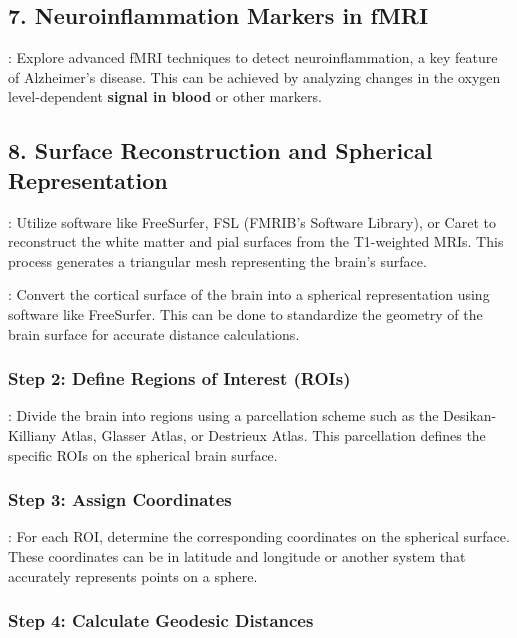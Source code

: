 \documentclass[twocolumn]{article}
\begin{document}
\subsection*{7. Neuroinflammation Markers in fMRI}

: Explore advanced fMRI techniques to detect neuroinflammation, a key feature of Alzheimer's disease. This can be
achieved by analyzing changes in the oxygen level-dependent \textbf{ signal in blood} or other markers.

\subsection*{8. Surface Reconstruction and Spherical Representation}

: Utilize software like FreeSurfer, FSL (FMRIB's Software Library), or Caret to reconstruct the white matter
and pial surfaces from the T1-weighted MRIs. This process generates a triangular mesh representing the brain's surface.

: Convert the cortical surface of the brain into a spherical representation using software like FreeSurfer. This can be
done to standardize the geometry of the brain surface for accurate distance calculations.

\subsubsection*{Step  2: Define Regions of Interest (ROIs)}

: Divide the brain into regions using a parcellation scheme such as the Desikan-Killiany Atlas, Glasser Atlas, or
Destrieux Atlas. This parcellation defines the specific ROIs on the spherical brain surface.

\subsubsection*{Step  3: Assign Coordinates}

: For each ROI, determine the corresponding coordinates on the spherical surface. These coordinates can be in
latitude and longitude or another system that accurately represents points on a sphere.

\subsubsection*{Step  4: Calculate Geodesic Distances}
\end{document}
